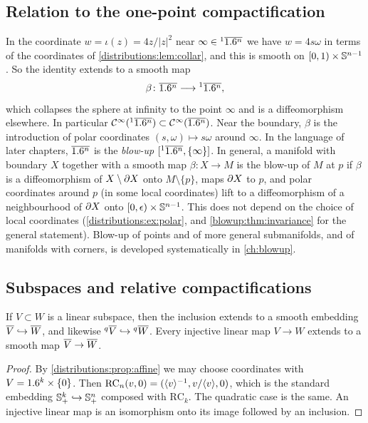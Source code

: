 \subsection{Relation to the one-point compactification}
In the coordinate $w=\iota(z)=4z/|z|^2$ near $\infty\in{}^{1}\overline{1.6^n}$ we have
$w=4s\omega$ in terms of the coordinates of \cref{distributions:lem:collar}, and this
is smooth on $[0,1)\times\mathbb{S}^{n-1}$. So the identity extends to a smooth map
\[
  \beta\colon\overline{1.6^n}\longrightarrow{}^{1}\overline{1.6^n},
\]
which collapses the sphere at infinity to the point $\infty$ and is a diffeomorphism
elsewhere. In particular $\mathcal{C}^\infty({}^{1}\overline{1.6^n})\subset\mathcal{C}^\infty(\overline{1.6^n})$. Near the boundary,
$\beta$ is the introduction of polar coordinates $(s,\omega)\mapsto s\omega$ around
$\infty$. In the language of later chapters, $\overline{1.6^n}$ is the \emph{blow-up}
$[{}^{1}\overline{1.6^n},\{\infty\}]$. In general, a manifold with boundary $X$ together with a smooth
map $\beta\colon X\to M$ is the blow-up of $M$ at $p$ if $\beta$ is a diffeomorphism of
$X\setminus\partial X$ onto $M\setminus\{p\}$, maps $\partial X$ to $p$, and polar coordinates
around $p$ (in some local coordinates) lift to a diffeomorphism of a neighbourhood of
$\partial X$ onto $[0,\epsilon)\times\mathbb{S}^{n-1}$. This does not depend on the choice of local
coordinates (\cref{distributions:ex:polar}, and \cref{blowup:thm:invariance} for the
general statement). Blow-up of points and of more general submanifolds, and of manifolds
with corners, is developed systematically in \cref{ch:blowup}.

\subsection{Subspaces and relative compactifications}
\begin{proposition}\label{distributions:prop:inclusion}
If $V\subset W$ is a linear subspace, then the inclusion extends to a smooth embedding
$\overline{V}\hookrightarrow\overline{W}$, and likewise ${}^{q}\overline{V}\hookrightarrow{}^{q}\overline{W}$. Every
injective linear map $V\to W$ extends to a smooth map $\overline{V}\to\overline{W}$.
\end{proposition}
\begin{proof}
By \cref{distributions:prop:affine} we may choose coordinates with $V=1.6^k\times\{0\}$.
Then $\mathrm{RC}_n(v,0)=(\langle v\rangle^{-1},v/\langle v\rangle,0)$, which is the standard embedding
$\mathbb{S}^k_+\hookrightarrow\mathbb{S}^n_+$ composed with $\mathrm{RC}_k$. The quadratic case is
the same. An injective linear map is an isomorphism onto its image followed by an
inclusion.
\end{proof}

